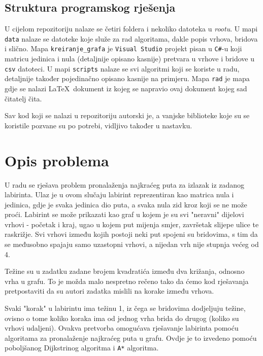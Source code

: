 \documentclass[11pt]{article}
\let\Oldlatex\LaTeX
\renewcommand{\LaTeX}{\textrm{\Oldlatex}}
\begin{document}
\subsection{Struktura programskog rješenja}

U cijelom repozitoriju nalaze se četiri foldera i nekoliko datoteka u
\textit{rootu}. U mapi \texttt{data} nalaze se datoteke koje služe za rad
algoritama, dakle popis vrhova, bridova i slično.
Mapa \texttt{kreiranje\_grafa} je \texttt{Visual Studio} projekt pisan u
\texttt{C\#}-u koji matricu jedinica i nula (detaljnije opisano kasnije)
pretvara u vrhove i bridove u \texttt{csv} datoteci.
U mapi \texttt{scripts} nalaze se svi algoritmi koji se koriste u radu,
detaljnije također pojedinačno opisano kasnije na primjeru.
Mapa \texttt{rad} je mapa gdje se nalazi \LaTeX\ dokument iz kojeg se
napravio ovaj dokument kojeg sad čitatelj čita.

Sav kod koji se nalazi u repozitoriju autorski je, a vanjske biblioteke koje su
se koristile pozvane su po potrebi, vidljivo također u nastavku.

	\section{Opis problema}
	U radu se rješava problem pronalaženja najkraćeg puta za izlazak iz zadanog labirinta. Ulaz je u ovom slučaju labirint reprezentiran kao matrica nula i jedinica, gdje je svaka jedinica dio puta, a svaka nula zid kroz koji se ne može proći. Labirint se može prikazati kao graf u kojem je su svi "neravni" dijelovi vrhovi - početak i kraj, ugao u kojem put mijenja smjer, završetak slijepe ulice te raskrižje. Svi vrhovi između kojih postoji neki put spojeni su bridovima, s tim da se međusobno spajaju samo uzastopni vrhovi, a nijedan vrh nije stupnja većeg od 4.

	Težine su u zadatku zadane brojem kvadratića između dva križanja, odnosno vrha u grafu. To je možda malo nespretno rečeno tako da ćemo kod rješavanja pretpostaviti da su autori zadatka mislili na korake između vrhova.

	Svaki "korak" u labirintu ima težinu 1, iz čega se bridovima dodjeljuju težine, ovisno o tome koliko koraka ima od jednog vrha brida do drugog (koliko su vrhovi udaljeni). Ovakva pretvorba omogućava rješavanje labirinta pomoću algoritama za pronalaženje najkraćeg puta u grafu. Ovdje je to izvedeno pomoću poboljšanog Dijkstrinog algoritma i \texttt{A*} algoritma.
\end{document}
